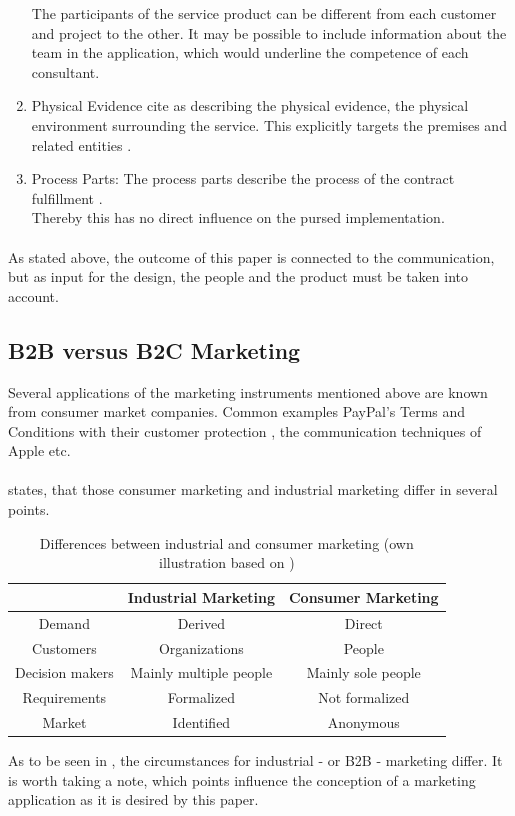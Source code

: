 \begin{enumerate}
    The participants of the service product can be different from each customer and project to the other. It may be possible to include information about the team in the application, which would underline the competence of each consultant.
    \item{Physical Evidence}
    \textcite[155]{AzilaGbettor2013} cite \textcite{Booms.1981} as describing the physical evidence, the physical environment surrounding the service. This explicitly targets the premises and related entities \parencite[cf.]{Hoepner2015}.
    \item{Process Parts:}
    The process parts describe the process of the contract fulfillment \parencite{Hoepner2015}.\\
    Thereby this has no direct influence on the pursed implementation. 
\end{enumerate}
\paragraph*{} As stated above, the outcome of this paper is connected to the communication, but as input for the design, the people and the product must be taken into account. 
\subsection{B2B versus B2C Marketing}
Several applications of the marketing instruments mentioned above are known from consumer market companies. Common examples PayPal's Terms and Conditions with their customer protection \parencite[see][]{PayPal}, the communication techniques of Apple etc.
\paragraph*{} \textcite[20-21]{Backhaus.2015b} states, that those consumer marketing and industrial marketing differ in several points.
\begin{table}[H]
\begin{center}
\begin{tabular}{|c|c|c|}
\hline 
 & Industrial Marketing & Consumer Marketing \\ 
\hline 
Demand & Derived & Direct \\ 
\hline 
Customers & Organizations & People \\ 
\hline 
Decision makers & Mainly multiple people & Mainly sole people \\ 
\hline 
Requirements & Formalized & Not formalized \\ 
\hline 
Market & Identified & Anonymous \\ 
\hline 
\end{tabular} 
\end{center}
\caption[Differences between industrial and consumer marketing]{Differences between industrial and consumer marketing (own illustration based on \protect\cite[21]{Backhaus.2015b})}
\label{tab:marketingdiff}
\end{table}
As to be seen in , the circumstances for industrial - or B2B - marketing differ. It is worth taking a note, which points influence the conception of a marketing application as it is desired by this paper. 
